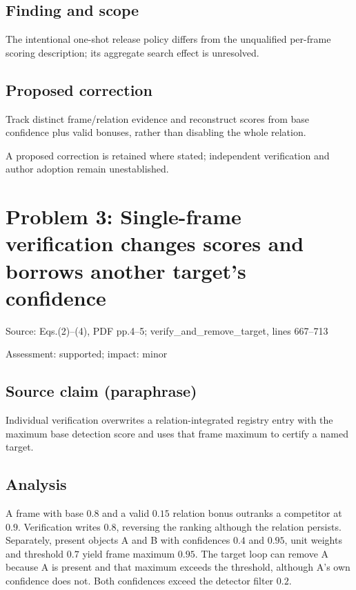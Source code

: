 \documentclass[11pt]{article}
\begin{document}
\subsection*{Finding and scope}

The intentional one-shot release policy differs from the unqualified per-frame scoring description; its aggregate search effect is unresolved.

\subsection*{Proposed correction}

Track distinct frame/relation evidence and reconstruct scores from base confidence plus valid bonuses, rather than disabling the whole relation.

A proposed correction is retained where stated; independent verification and author adoption remain unestablished.

\section*{Problem 3: Single-frame verification changes scores and borrows another target’s confidence}

Source: Eqs.(2)–(4), PDF pp.4–5; verify\_and\_remove\_target, lines 667–713

Assessment: supported; impact: minor

\subsection*{Source claim (paraphrase)}

Individual verification overwrites a relation-integrated registry entry with the maximum base detection score and uses that frame maximum to certify a named target.

\subsection*{Analysis}

A frame with base \(0.8\) and a valid \(0.15\) relation bonus outranks a competitor at \(0.9\). Verification writes \(0.8\), reversing the ranking although the relation persists. Separately, present objects A and B with confidences \(0.4\) and \(0.95\), unit weights and threshold \(0.7\) yield frame maximum \(0.95\). The target loop can remove A because A is present and that maximum exceeds the threshold, although A’s own confidence does not. Both confidences exceed the detector filter \(0.2\).
\end{document}
